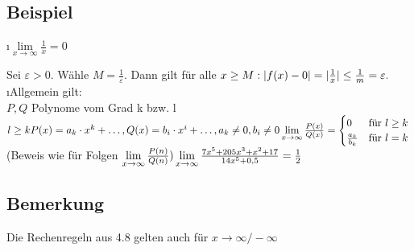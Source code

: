 \subsection[Beispiel]{Beispiel}
\begin{enumerate}[a)]
\i $\lim\limits_{x \rightarrow \infty} \frac{1}{x} = 0$\qquad \begin{minipage}[c]{\textwidth}
\end{minipage}
Sei $\varepsilon > 0.$ Wähle $M = \frac{1}{\varepsilon}$. Dann gilt für alle $x \geq M:\\
\lvert f(x) - 0 \rvert = \lvert \frac{1}{x} \rvert \leq \frac{1}{m} = \varepsilon.$\\
\i Allgemein gilt: \\
$P,Q$ Polynome vom Grad k bzw. l $l \geq k\\
P(x) = a_k \cdot x^k + \ldots , Q(x) = b_i \cdot x^i + \ldots, a_k \not = 0, b_i \not = 0
\lim\limits_{x \rightarrow \infty}\frac{P(x)}{Q(x)} = \begin{cases}
0 & \text{für }l \geq k\\
\frac{a_k}{b_k} &\text{für } l = k
\end{cases}\\$
(Beweis wie für Folgen $\lim\limits_{x \rightarrow \infty}\frac{P(n)}{Q(n)})\\
\lim\limits_{x \rightarrow \infty} \frac{7x^5 + 205x^3+x^2 + 17}{14x^5 + 0,5} = \frac{1}{2}$
\end{enumerate}
\subsection{Bemerkung}
Die Rechenregeln aus 4.8 gelten auch für $x \rightarrow \infty / -\infty$
